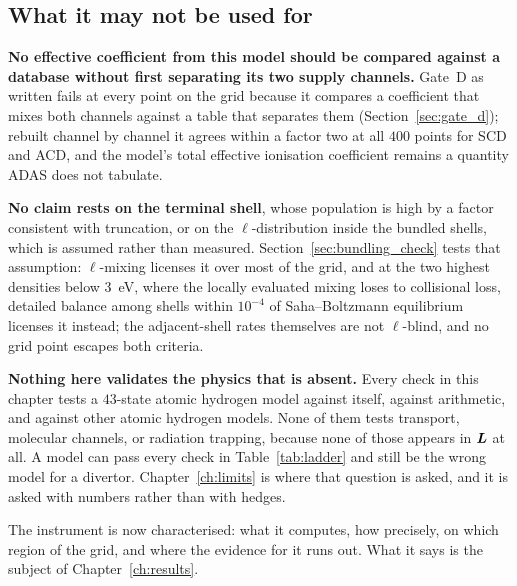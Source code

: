 \subsection{What it may not be used for}

\textbf{No effective coefficient from this model should be compared against a
database without first separating its two supply channels.} Gate~D as written
fails at every point on the grid because it compares a coefficient that mixes
both channels against a table that separates them (Section~\ref{sec:gate_d});
rebuilt channel by channel it agrees within a factor two at all $400$ points
for SCD and ACD, and the model's total effective ionisation coefficient remains
a quantity ADAS does not tabulate.

\textbf{No claim rests on the terminal shell}, whose population is high by a
factor consistent with truncation, or on the $\ell$-distribution inside the
bundled shells, which is assumed rather than measured.
Section~\ref{sec:bundling_check} tests that assumption: $\ell$-mixing licenses
it over most of the grid, and at the two highest densities below
\SI{3}{\electronvolt}, where the locally evaluated mixing loses to collisional
loss, detailed balance among shells within $10^{-4}$ of Saha--Boltzmann
equilibrium licenses it instead; the adjacent-shell rates themselves are not
$\ell$-blind, and no grid point escapes both criteria.

\textbf{Nothing here validates the physics that is absent.} Every check in this
chapter tests a $43$-state atomic hydrogen model against itself, against
arithmetic, and against other atomic hydrogen models. None of them tests
transport, molecular channels, or radiation trapping, because none of those
appears in $\bm{L}$ at all. A model can pass every check in
Table~\ref{tab:ladder} and still be the wrong model for a divertor.
Chapter~\ref{ch:limits} is where that question is asked, and it is asked with
numbers rather than with hedges.

\medskip
The instrument is now characterised: what it computes, how precisely, on which
region of the grid, and where the evidence for it runs out. What it says is the
subject of Chapter~\ref{ch:results}.
